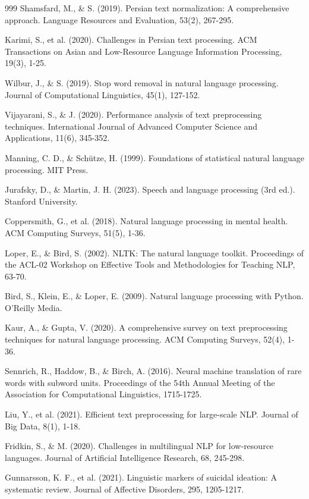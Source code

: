 \begin{thebibliography}{999}
 Shamsfard, M., \& S. (2019). Persian text normalization: A comprehensive approach. Language Resources and Evaluation, 53(2), 267-295.

 Karimi, S., et al. (2020). Challenges in Persian text processing. ACM Transactions on Asian and Low-Resource Language Information Processing, 19(3), 1-25.

 Wilbur, J., \& S. (2019). Stop word removal in natural language processing. Journal of Computational Linguistics, 45(1), 127-152.

 Vijayarani, S., \& J. (2020). Performance analysis of text preprocessing techniques. International Journal of Advanced Computer Science and Applications, 11(6), 345-352.

 Manning, C. D., \& Schütze, H. (1999). Foundations of statistical natural language processing. MIT Press.

 Jurafsky, D., \& Martin, J. H. (2023). Speech and language processing (3rd ed.). Stanford University.

 Coppersmith, G., et al. (2018). Natural language processing in mental health. ACM Computing Surveys, 51(5), 1-36.

 Loper, E., \& Bird, S. (2002). NLTK: The natural language toolkit. Proceedings of the ACL-02 Workshop on Effective Tools and Methodologies for Teaching NLP, 63-70.

 Bird, S., Klein, E., \& Loper, E. (2009). Natural language processing with Python. O'Reilly Media.

 Kaur, A., \& Gupta, V. (2020). A comprehensive survey on text preprocessing techniques for natural language processing. ACM Computing Surveys, 52(4), 1-36.

 Sennrich, R., Haddow, B., \& Birch, A. (2016). Neural machine translation of rare words with subword units. Proceedings of the 54th Annual Meeting of the Association for Computational Linguistics, 1715-1725.

 Liu, Y., et al. (2021). Efficient text preprocessing for large-scale NLP. Journal of Big Data, 8(1), 1-18.

 Fridkin, S., \& M. (2020). Challenges in multilingual NLP for low-resource languages. Journal of Artificial Intelligence Research, 68, 245-298.

 Gunnarsson, K. F., et al. (2021). Linguistic markers of suicidal ideation: A systematic review. Journal of Affective Disorders, 295, 1205-1217.


\end{thebibliography}
